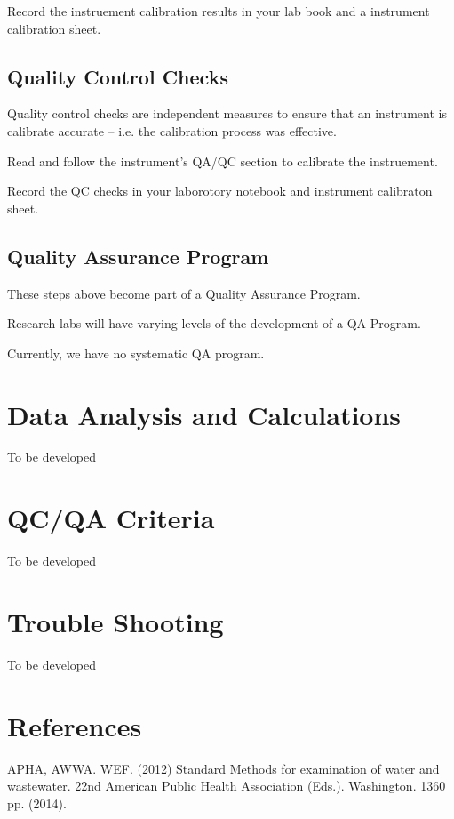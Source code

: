 \documentclass[12pt]{../SOP3_beta}
\begin{document}
\NP Record the instruement calibration results in your lab book and a instrument calibration sheet.

\subsection{Quality Control Checks}

\NP Quality control checks are independent measures to ensure that an instrument is calibrate accurate -- i.e. the calibration process was effective.

\NP Read and follow the instrument's QA/QC section to calibrate the instruement.

\NP Record the QC checks in your laborotory notebook and instrument calibraton sheet.

\subsection{Quality Assurance Program}

\NP These steps above become part of a Quality Assurance Program. 

\NP Research labs will have varying levels of the development of a QA Program.

\NP Currently, we have no systematic QA program.

\section{Data Analysis and Calculations}

\NP To be developed 

\section{QC/QA Criteria}

\NP To be developed

\section{Trouble Shooting}

\NP To be developed

\section{References}

\NP APHA, AWWA. WEF. (2012) Standard Methods for examination of water and wastewater. 22nd American Public Health Association (Eds.). Washington. 1360 pp. (2014).
\end{document}
